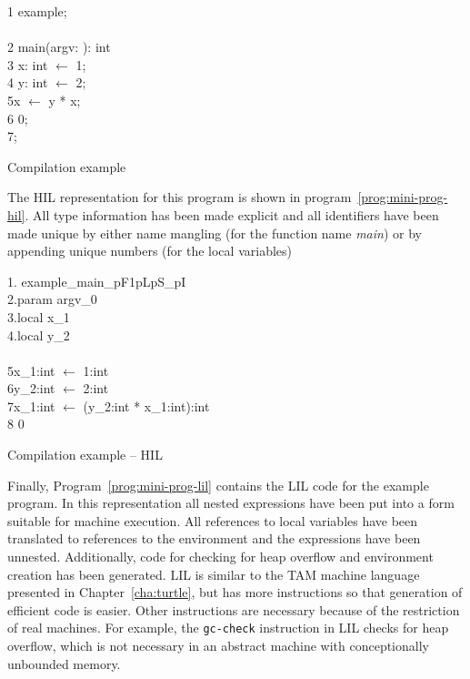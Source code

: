 \begin{Program}
\begin{ttlprog}
1\>\ttlModule{} example;\\
\\
2\>\ttlPublic{} \ttlFun{} main(argv: \ttlList{} \ttlOf{} \ttlString{}): int\\
3\>\>\ttlVar{} x: int $\leftarrow$ 1;\\
4\>\>\ttlVar{} y: int $\leftarrow$ 2;\\
5\>\>x $\leftarrow$ y * x;\\
6\>\>\ttlReturn{} 0;\\
7\>\ttlEnd{};
\end{ttlprog}
\caption{Compilation example}
\label{prog:mini-prog}

\end{Program}

The HIL representation for this program is shown in
program~\ref{prog:mini-prog-hil}.  All type information has been made
explicit and all identifiers have been made unique by either name
mangling (for the function name {\em main}) or by appending unique
numbers (for the local variables)

\begin{Program}
\begin{ttlprog}
1\>.\ttlFun{} example\_main\_pF1pLpS\_pI\\
2\>\>.param argv\_0\\
3\>\>.local x\_1\\
4\>\>.local y\_2\\
\\
5\>\>x\_1:int $\leftarrow$ 1:int\\
6\>\>y\_2:int $\leftarrow$ 2:int\\
7\>\>x\_1:int $\leftarrow$ (y\_2:int * x\_1:int):int\\
8\>\>\ttlReturn{} 0
\end{ttlprog}
\caption{Compilation example -- HIL}
\label{prog:mini-prog-hil}
\end{Program}

Finally, Program~\ref{prog:mini-prog-lil} contains the LIL code for
the example program. In this representation all nested expressions
have been put into a form suitable for machine execution.  All
references to local variables have been translated to references to
the environment and the expressions have been unnested.  Additionally,
code for checking for heap overflow and environment creation has been
generated.  LIL is similar to the TAM machine language presented in
Chapter~\ref{cha:turtle}, but has more instructions so that generation
of efficient code is easier. Other instructions are necessary because
of the restriction of real machines. For example, the {\tt gc-check}
instruction in LIL checks for heap overflow, which is not necessary in
an abstract machine with conceptionally unbounded memory.

